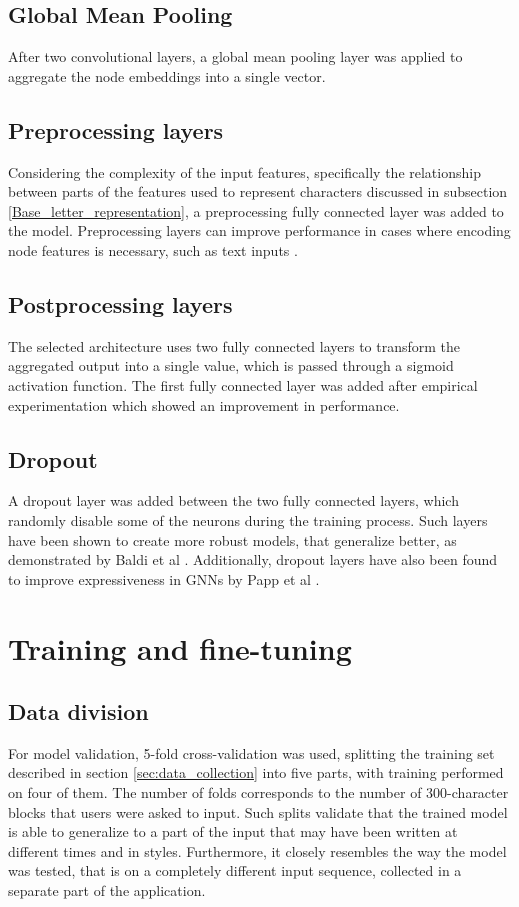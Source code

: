 \subsection{Global Mean Pooling}
After two convolutional layers, a global mean pooling layer was applied to aggregate the node embeddings into a single vector. 


\subsection{Preprocessing layers}
Considering the complexity of the input features, specifically the relationship between parts of the features used to represent characters discussed in subsection \ref{Base_letter_representation}, a preprocessing fully connected layer was added to the model. Preprocessing layers can improve performance in cases where encoding node features is necessary, such as text inputs \cite{Lesk2024}.

\subsection{Postprocessing layers}
The selected architecture uses two fully connected layers to transform the aggregated output into a single value, 
which is passed through a sigmoid activation function. The first fully connected layer was added after empirical experimentation which showed an improvement in performance.


\subsection{Dropout}
A dropout layer was added between the two fully connected layers, which randomly disable some of the neurons during the training process. Such layers have been shown to create more robust models, that generalize better, as demonstrated by Baldi et al \cite{NIPS2013_71f6278d}. Additionally, dropout layers have also been found to improve expressiveness in GNNs by Papp et al \cite{NEURIPS2021_b8b2926b}.

\section{Training and fine-tuning}

\subsection{Data division}
For model validation, 5-fold cross-validation was used, splitting the training set described in section \ref{sec:data_collection} into five parts, with training performed on four of them. The number of folds corresponds to the number of 300-character blocks that users were asked to input. Such splits validate that the trained model is able to generalize to a part of the input that may have been written at different times and in styles. Furthermore, it closely resembles the way the model was tested, that is on a completely different input sequence, collected in a separate part of the application.  

